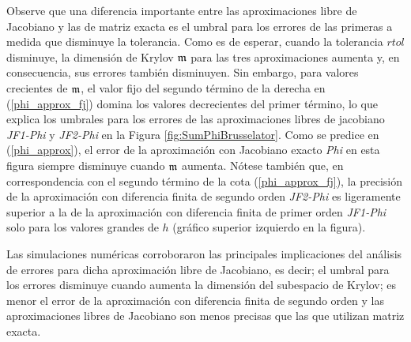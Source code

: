 Observe que una diferencia importante entre las aproximaciones libre de Jacobiano y las de matriz exacta es el umbral para los errores de las primeras a medida que disminuye la tolerancia. Como es de esperar, cuando la tolerancia $rtol$ disminuye, la dimensión de Krylov $\mathfrak{m}$ para las tres aproximaciones aumenta y, en consecuencia, sus errores también disminuyen. Sin embargo, para valores crecientes de $\mathfrak{m}$, el valor fijo del segundo término de la derecha en (\ref{phi_approx_fj}) domina los valores decrecientes del primer término, lo que explica los umbrales para los errores de las aproximaciones libres de jacobiano \textit{JF1-Phi} y \textit{JF2-Phi} en la Figura \ref{fig:SumPhiBrusselator}. Como se predice en (\ref{phi_approx}), el error de la aproximación con Jacobiano exacto \textit{Phi} en esta figura siempre disminuye cuando $\mathfrak{m}$ aumenta. Nótese también que, en correspondencia con el segundo término de la cota (\ref{phi_approx_fj}), la precisión de la aproximación con diferencia finita de segundo orden \textit{JF2-Phi} es ligeramente superior a la de la aproximación con diferencia finita de primer orden \textit{JF1-Phi} solo para los valores grandes de $h$ (gráfico superior izquierdo en la figura).

Las simulaciones numéricas corroboraron las principales implicaciones del análisis de errores para dicha aproximación libre de Jacobiano, es decir; el umbral para los errores disminuye cuando aumenta la dimensión del subespacio de Krylov; es menor el error de la aproximación con diferencia finita de segundo orden y  las aproximaciones libres de Jacobiano son menos precisas que las que utilizan matriz exacta.
